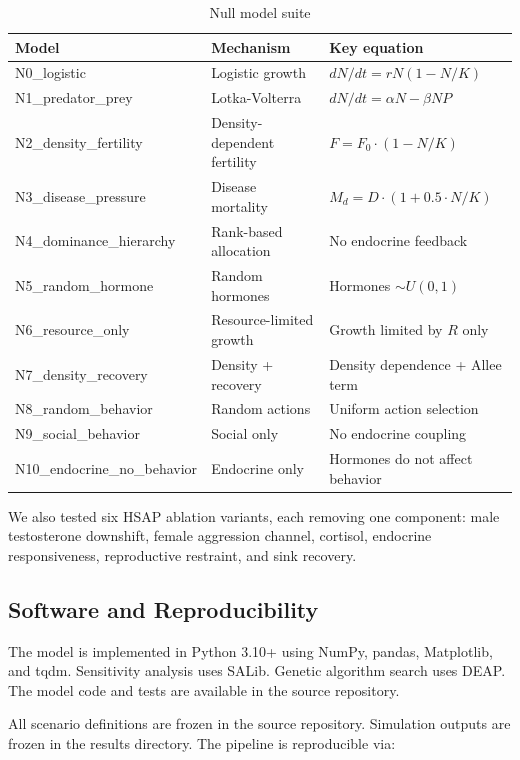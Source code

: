 \begin{table}[h]
\centering
\caption{Null model suite}
\label{tab:null_models}
\begin{tabular}{lll}
\toprule
Model & Mechanism & Key equation \\
\midrule
N0\_logistic & Logistic growth & $dN/dt = rN(1-N/K)$ \\
N1\_predator\_prey & Lotka-Volterra & $dN/dt = \alpha N - \beta NP$ \\
N2\_density\_fertility & Density-dependent fertility & $F = F_0 \cdot (1 - N/K)$ \\
N3\_disease\_pressure & Disease mortality & $M_d = D \cdot (1 + 0.5 \cdot N/K)$ \\
N4\_dominance\_hierarchy & Rank-based allocation & No endocrine feedback \\
N5\_random\_hormone & Random hormones & Hormones $\sim U(0,1)$ \\
N6\_resource\_only & Resource-limited growth & Growth limited by $R$ only \\
N7\_density\_recovery & Density + recovery & Density dependence + Allee term \\
N8\_random\_behavior & Random actions & Uniform action selection \\
N9\_social\_behavior & Social only & No endocrine coupling \\
N10\_endocrine\_no\_behavior & Endocrine only & Hormones do not affect behavior \\
\bottomrule
\end{tabular}
\end{table}

We also tested six HSAP ablation variants, each removing one component: male testosterone downshift, female aggression channel, cortisol, endocrine responsiveness, reproductive restraint, and sink recovery.

\subsection{Software and Reproducibility}
\label{sec:software}

The model is implemented in Python 3.10+ using NumPy, pandas, Matplotlib, and tqdm. Sensitivity analysis uses SALib. Genetic algorithm search uses DEAP. The model code and tests are available in the source repository.

All scenario definitions are frozen in the source repository. Simulation outputs are frozen in the results directory. The pipeline is reproducible via:

